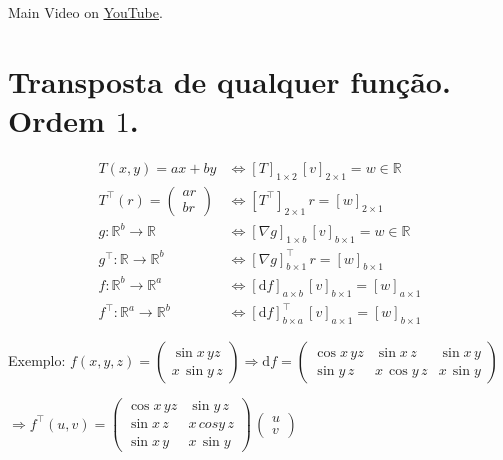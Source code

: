 \documentclass[12pt]{article}
\begin{document}
Main Video on \href{https://www.youtube.com/watch?v=mmzqmIcX7xo}{\underline{YouTube}}.

\section{Transposta de qualquer fun\c{c}\~ao. Ordem $1$.}

\begin{align}
  T(x, y) = ax + by &\Leftrightarrow [T]_{1 \times 2}\, [v]_{2 \times 1} = w \in \mathbb{R} \\
  T^\top(r) = \left( \begin{matrix} ar \\ br \end{matrix} \right) &\Leftrightarrow [T^\top]_{2 \times 1}\,r = [w]_{2 \times 1} \\
  g : \mathbb{R}^b \rightarrow \mathbb{R} &\Leftrightarrow [\nabla g]_{1 \times b}\,[v]_{b \times 1} = w \in \mathbb{R} \\
  g^\top : \mathbb{R} \rightarrow \mathbb{R}^b &\Leftrightarrow [\nabla g]^\top_{b \times 1}\,r = [w]_{b \times 1} \\
  f : \mathbb{R}^b \rightarrow \mathbb{R}^a &\Leftrightarrow [\mathrm{d} f]_{a \times b}\,[v]_{b \times 1} = [w]_{a \times 1} \\
  f^\top : \mathbb{R}^a \rightarrow \mathbb{R}^b &\Leftrightarrow [\mathrm{d} f]^\top_{b \times a}\,[v]_{a \times 1} = [w]_{b \times 1}
\end{align}

	Exemplo: $f(x,y,z) = \left( \begin{matrix} \sin x\,yz \\ x\,\sin y\,z \end{matrix} \right) \Rightarrow \mathrm{d}f = \left( \begin{matrix} \cos x\,yz & \sin x\,z & \sin x\,y \\ \sin y\,z & x\, \cos y\,z & x\,\sin y \end{matrix} \right)$

	$\Rightarrow f^\top (u,v) = \left( \begin{matrix} \cos x\,yz & \sin y\,z \\ \sin x\,z & x\,cos y\,z \\ \sin x\,y & x\,\sin y \end{matrix} \right) \, \left( \begin{matrix} u \\ v \end{matrix} \right) $
\end{document}
